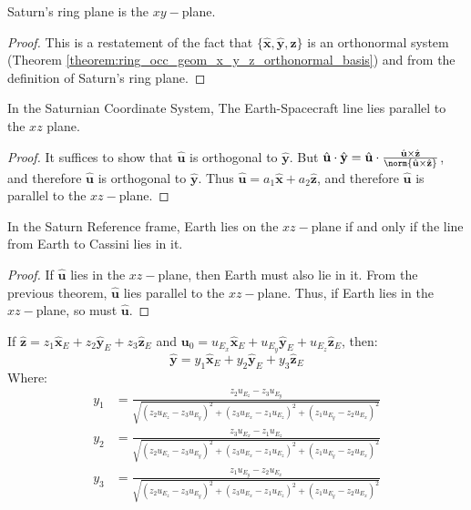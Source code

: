 \documentclass[crop=false,class=book,oneside]{standalone}
\begin{document}
            \begin{theorem}
            Saturn's ring plane is the $xy-$plane.
            \end{theorem}
            \begin{proof}
            This is a restatement of the fact that $\{\hat{\mathbf{x}},\hat{\mathbf{y}},\hat{\mathbf{z}}\}$ is an orthonormal system (Theorem \ref{theorem:ring_occ_geom_x_y_z_orthonormal_basis}) and from the definition of Saturn's ring plane.
            \end{proof}
            \begin{theorem}
            In the Saturnian Coordinate System, The Earth-Spacecraft line lies parallel to the $xz$ plane.
            \end{theorem}
            \begin{proof}
            It suffices to show that $\hat{\mathbf{u}}$ is orthogonal to $\hat{\mathbf{y}}$. But $\hat{\mathbf{u}}\cdot \hat{\mathbf{y}} = \hat{\mathbf{u}}\cdot \frac{\hat{\mathbf{u}}\times \hat{\mathbf{z}}}{\norm{\hat{\mathbf{u}}\times \hat{\mathbf{z}}}}$, and therefore $\hat{\mathbf{u}}$ is orthogonal to $\hat{\mathbf{y}}$. Thus $\hat{\mathbf{u}} = a_1\hat{\mathbf{x}} + a_2\hat{\mathbf{z}}$, and therefore $\hat{\mathbf{u}}$ is parallel to the $xz-$plane.
            \end{proof}
            \begin{theorem}
            In the Saturn Reference frame, Earth lies on the $xz-$plane if and only if the line from Earth to Cassini lies in it.
            \end{theorem}
            \begin{proof}
            If $\hat{\mathbf{u}}$ lies in the $xz-$plane, then Earth must also lie in it. From the previous theorem, $\hat{\mathbf{u}}$ lies parallel to the $xz-$plane. Thus, if Earth lies in the $xz-$plane, so must $\hat{\mathbf{u}}$.
            \end{proof}
            \begin{theorem}
            If $\hat{\mathbf{z}} = z_1\hat{\mathbf{x}}_{E}+z_2\hat{\mathbf{y}}_{E}+z_3\hat{\mathbf{z}}_{E}$ and $\mathbf{u}_{0} = u_{E_{x}}\hat{\mathbf{x}}_{E}+u_{E_{y}}\hat{\mathbf{y}}_{E}+u_{E_{z}}\hat{\mathbf{z}}_{E}$, then:
            \begin{equation*}
            \hat{\mathbf{y}} = y_{1}\hat{\mathbf{x}}_{E}+y_2\hat{\mathbf{y}}_{E}+y_3\hat{\mathbf{z}}_{E}
            \end{equation*}
            Where:
            \begin{align*}
            y_1 &= \frac{z_2u_{E_{z}} - z_{3}u_{E_{y}}}{\sqrt{(z_2u_{E_{z}}-z_3u_{E_{y}})^2+(z_3u_{E_{x}}-z_1u_{E_{z}})^2+(z_1u_{E_{y}}-z_2u_{E_{x}})^2}} \\
            y_2 &= \frac{z_3u_{E_{x}} - z_{1}u_{E_{z}}}{\sqrt{(z_2u_{E_{z}}-z_3u_{E_{y}})^2+(z_3u_{E_{x}}-z_1u_{E_{z}})^2+(z_1u_{E_{y}}-z_2u_{E_{x}})^2}} \\
            y_3 &= \frac{z_1u_{E_{y}} - z_2u_{E_{x}}}{\sqrt{(z_2u_{E_{z}}-z_3u_{E_{y}})^2+(z_3u_{E_{x}}-z_1u_{E_{z}})^2+(z_1u_{E_{y}}-z_2u_{E_{x}})^2}}
            \end{align*}
            \end{theorem}
\end{document}
